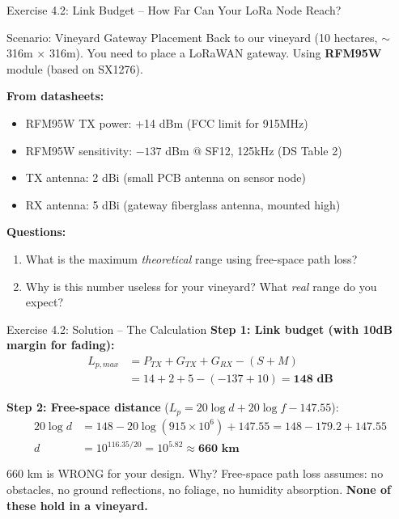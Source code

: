 \documentclass[aspectratio=169,11pt]{beamer}
\begin{document}
\begin{frame}{Exercise 4.2: Link Budget -- How Far Can Your LoRa Node Reach?}
    \begin{block}{Scenario: Vineyard Gateway Placement}
        Back to our vineyard (10 hectares, $\sim$316m $\times$ 316m). You need to place a LoRaWAN gateway. Using \textbf{RFM95W} module (based on SX1276).
        
        \vspace{0.2cm}
        \textbf{From datasheets:}
        \begin{itemize}
            \item RFM95W TX power: +14 dBm (FCC limit for 915MHz)
            \item RFM95W sensitivity: $-137$ dBm @ SF12, 125kHz (DS Table 2)
            \item TX antenna: 2 dBi (small PCB antenna on sensor node)
            \item RX antenna: 5 dBi (gateway fiberglass antenna, mounted high)
        \end{itemize}
        
        \vspace{0.2cm}
        \textbf{Questions:}
        \begin{enumerate}
            \item What is the maximum \textit{theoretical} range using free-space path loss?
            \item Why is this number useless for your vineyard? What \textit{real} range do you expect?
        \end{enumerate}
    \end{block}
\end{frame}

\begin{frame}{Exercise 4.2: Solution -- The Calculation}
    \textbf{Step 1: Link budget (with 10dB margin for fading):}
    \begin{align*}
        L_{p,max} &= P_{TX} + G_{TX} + G_{RX} - (S + M) \\
        &= 14 + 2 + 5 - (-137 + 10) = \textbf{148 dB}
    \end{align*}
    
    \textbf{Step 2: Free-space distance} ($L_p = 20\log d + 20\log f - 147.55$):
    \begin{align*}
        20\log d &= 148 - 20\log(915\times10^6) + 147.55 = 148 - 179.2 + 147.55 \\
        d &= 10^{116.35/20} = 10^{5.82} \approx \textbf{660 km}
    \end{align*}
    
    \begin{alertblock}{660 km is WRONG for your design. Why?}
        Free-space path loss assumes: no obstacles, no ground reflections, no foliage, no humidity absorption. \textbf{None of these hold in a vineyard.}
    \end{alertblock}
\end{frame}
\end{document}

